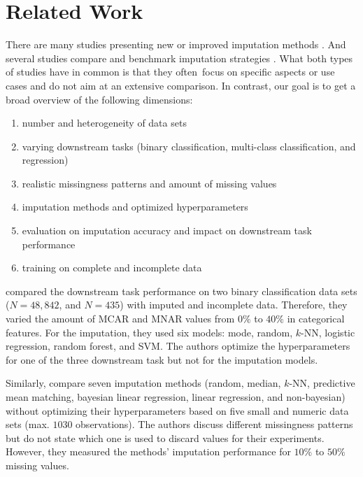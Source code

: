 \section{Related Work}
\label{sec:related_work}
%
There are many studies presenting new or improved imputation methods \citep{Imputation_Benchmark_4, Imputation_Benchmark_6, GAIN, VAE_for_genomic_data, HIVAE, MisGAN, VIGAN}. And several studies compare and benchmark imputation strategies \citep{Imputation_Benchmark_1, Imputation_Benchmark_2, Imputation_Benchmark_3}. What both types of studies have in common is that they often focus on specific aspects or use cases and do not aim at an extensive comparison. In contrast, our goal is to get a broad overview of the following dimensions:
%
\begin{enumerate}
	\item number and heterogeneity of data sets
	\item varying downstream tasks (binary classification, multi-class classification, and regression)
	\item realistic missingness patterns and amount of missing values
	\item imputation methods and optimized hyperparameters
	\item evaluation on imputation accuracy and impact on downstream task performance
	\item training on complete and incomplete data
\end{enumerate}

\cite{Imputation_Benchmark_3} compared the downstream task performance on two binary classification data sets ($N = 48,842$, and $N = 435$) with imputed and incomplete data. Therefore, they varied the amount of MCAR and MNAR values from $0\%$ to $40\%$ in categorical features. For the imputation, they used six models: mode, random, $k$-NN, logistic regression, random forest, and SVM. The authors optimize the hyperparameters for one of the three downstream task but not for the imputation models.

Similarly, \cite{Imputation_Benchmark_2} compare seven imputation methods (random, median, $k$-NN, predictive mean matching, bayesian linear regression, linear regression, and non-bayesian) without optimizing their hyperparameters based on five small and numeric data sets (max. $1030$ observations). The authors discuss different missingness patterns but do not state which one is used to discard values for their experiments. However, they measured the methods' imputation performance for $10\%$ to $50\%$ missing values.

